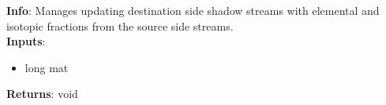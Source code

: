 \textbf{Info}: Manages updating destination side shadow streams with
elemental and isotopic fractions from the source side streams.\\

\noindent \textbf{Inputs}:
\begin{itemize}
\item{long mat}
\end{itemize}

\noindent \textbf{Returns}: void
